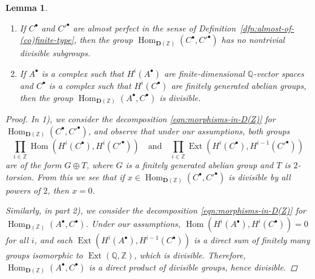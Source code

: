 \documentclass[leqno,12pt]{article}
\theoremstyle{plain}
\newtheorem{lemma}[theorem]{\indent\sc Lemma}
\theoremstyle{definition}
\DeclareMathOperator{\Hom}{Hom}
\DeclareMathOperator{\Ext}{Ext}
\newcommand{\QQ}{\mathbb{Q}}
\newcommand{\ZZ}{\mathbb{Z}}
\newcommand{\DZ}{{\mathbf{D} (\ZZ)}}
\begin{document}
\begin{lemma}
  \label{lemma:morphisms-inDAb-not-divisible}
  ~

  \begin{enumerate}
  \item[$1)$] If $C^\bullet$ and $C'^\bullet$ are almost perfect in the sense of
    Definition~{\rm\ref{dfn:almost-of-(co)finite-type}}, then the group
    $\Hom_\DZ (C^\bullet, C'^\bullet)$ has no nontrivial
    divisible subgroups.

  \item[$2)$] If $A^\bullet$ is a complex such that $H^i (A^\bullet)$ are
    finite-dimensional $\QQ$-vector spaces and $C^\bullet$ is a complex such
    that $H^i (C^\bullet)$ are finitely generated abelian groups, then the group
    $\Hom_\DZ (A^\bullet, C^\bullet)$ is divisible.
  \end{enumerate}

  \begin{proof}
    In 1), we consider the decomposition \eqref{eqn:morphisms-in-D(Z)} for
    $\Hom_\DZ (C^\bullet, C'^\bullet)$, and observe that under
    our assumptions, both groups
    \[ \prod_{i\in\ZZ} \Hom (H^i (C^\bullet), H^i (C'^\bullet))
      \quad\text{and}\quad
      \prod_{i\in\ZZ} \Ext (H^i (C^\bullet), H^{i-1} (C'^\bullet))\]
    are of the form $G \oplus T$, where $G$ is a finitely generated abelian
    group and $T$ is $2$-torsion. From this we see that if
    $x \in \Hom_\DZ (C^\bullet, C'^\bullet)$ is divisible by all
    powers of $2$, then $x = 0$.

    Similarly, in part 2), we consider the decomposition
    \eqref{eqn:morphisms-in-D(Z)} for
    $\Hom_\DZ (A^\bullet, C^\bullet)$. Under our assumptions,
    $\Hom (H^i (A^\bullet), H^i (C^\bullet)) = 0$ for all $i$, and each
    $\Ext (H^i (A^\bullet), H^{i-1} (C^\bullet))$ is a direct sum of
    finitely many groups isomorphic to $\Ext (\QQ,\ZZ)$, which is
    divisible. Therefore, $\Hom_\DZ (A^\bullet, C^\bullet)$ is
    a direct product of divisible groups, hence divisible.
  \end{proof}
\end{lemma}
\end{document}
